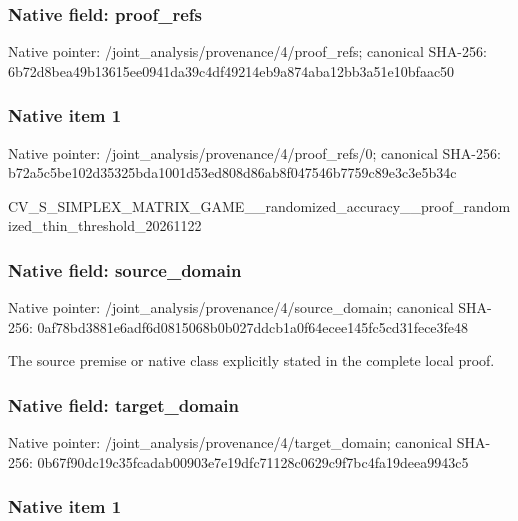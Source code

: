 \documentclass[10pt,a4paper]{article}
\begin{document}
\subsubsection{Native field: proof\_refs}


Native pointer: /joint\_analysis/provenance/4/proof\_refs; canonical SHA-256: 6b72d8bea49b13615ee0941d\allowbreak{}a39c4df49214eb9a874aba12\allowbreak{}bb3a51e10bfaac50



\subsubsection{Native item 1}


Native pointer: /joint\_analysis/provenan\allowbreak{}ce/4/proof\_refs/0; canonical SHA-256: b72a5c5be102d35325bda100\allowbreak{}1d53ed808d86ab8f047546b7\allowbreak{}759c89e3c3e5b34c


CV\_S\_SIMPLEX\_MATRIX\_GAME\allowbreak{}\_\_randomized\_accuracy\_\_p\allowbreak{}roof\_randomized\_thin\_thr\allowbreak{}eshold\_20261122


\subsubsection{Native field: source\_domain}


Native pointer: /joint\_analysis/provenan\allowbreak{}ce/4/source\_domain; canonical SHA-256: 0af78bd3881e6adf6d081506\allowbreak{}8b0b027ddcb1a0f64ecee145\allowbreak{}fc5cd31fece3fe48


The source premise or native class explicitly stated in the complete local proof.


\subsubsection{Native field: target\_domain}


Native pointer: /joint\_analysis/provenan\allowbreak{}ce/4/target\_domain; canonical SHA-256: 0b67f90dc19c35fcadab0090\allowbreak{}3e7e19dfc71128c0629c9f7b\allowbreak{}c4fa19deea9943c5



\subsubsection{Native item 1}
\end{document}
